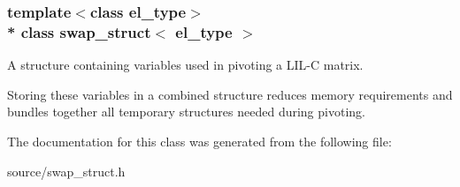 \subsubsection*{template$<$class el\+\_\+type$>$\\*
class swap\+\_\+struct$<$ el\+\_\+type $>$}

A structure containing variables used in pivoting a L\+I\+L-\/C matrix. 

Storing these variables in a combined structure reduces memory requirements and bundles together all temporary structures needed during pivoting. 

The documentation for this class was generated from the following file\+:\begin{DoxyCompactItemize}
\item 
source/swap\+\_\+struct.\+h\end{DoxyCompactItemize}

